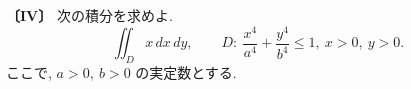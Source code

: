 \noindent\textbf{〔IV〕}
次の積分を求めよ.
\[
\iint_D x\,dx\,dy,\qquad
D:\ \frac{x^4}{a^4}+\frac{y^4}{b^4}\le 1,\ x>0,\ y>0.
\]
ここで, $a>0,\ b>0$ の実定数とする.
